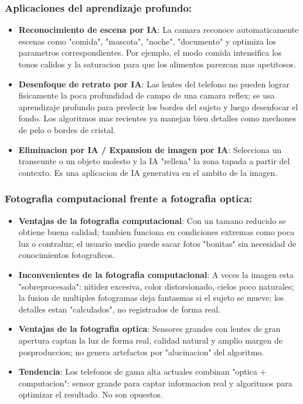 \subsubsection*{Aplicaciones del aprendizaje profundo:}

\begin{itemize}
  \item \textbf{Reconocimiento de escena por IA}: La camara reconoce automaticamente escenas como "comida", "mascota", "noche", "documento" y optimiza los parametros correspondientes. Por ejemplo, el modo comida intensifica los tonos calidos y la saturacion para que los alimentos parezcan mas apetitosos.
  \item \textbf{Desenfoque de retrato por IA}: Las lentes del telefono no pueden lograr fisicamente la poca profundidad de campo de una camara reflex; se usa aprendizaje profundo para predecir los bordes del sujeto y luego desenfocar el fondo. Los algoritmos mas recientes ya manejan bien detalles como mechones de pelo o bordes de cristal.
  \item \textbf{Eliminacion por IA / Expansion de imagen por IA}: Selecciona un transeunte o un objeto molesto y la IA "rellena" la zona tapada a partir del contexto. Es una aplicacion de IA generativa en el ambito de la imagen.
\end{itemize}

\subsubsection*{Fotografia computacional frente a fotografia optica:}

\begin{itemize}
  \item \textbf{Ventajas de la fotografia computacional}: Con un tamano reducido se obtiene buena calidad; tambien funciona en condiciones extremas como poca luz o contraluz; el usuario medio puede sacar fotos "bonitas" sin necesidad de conocimientos fotograficos.
  \item \textbf{Inconvenientes de la fotografia computacional}: A veces la imagen esta "sobreprocesada": nitidez excesiva, color distorsionado, cielos poco naturales; la fusion de multiples fotogramas deja fantasmas si el sujeto se mueve; los detalles estan "calculados", no registrados de forma real.
  \item \textbf{Ventajas de la fotografia optica}: Sensores grandes con lentes de gran apertura captan la luz de forma real, calidad natural y amplio margen de posproduccion; no genera artefactos por "alucinacion" del algoritmo.
  \item \textbf{Tendencia}: Los telefonos de gama alta actuales combinan "optica + computacion": sensor grande para captar informacion real y algoritmos para optimizar el resultado. No son opuestos.
\end{itemize}


